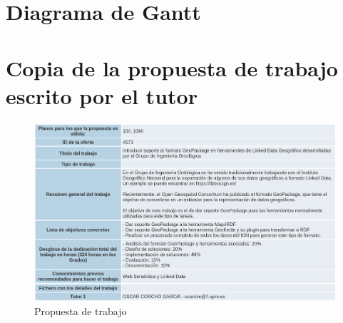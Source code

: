 \documentclass[11pt]{article}
\begin{document}
\section{Diagrama de Gantt}



\section{Copia de la propuesta de trabajo escrito por el tutor}
\begin{figure}[h]
    \includegraphics[width=\textwidth]{./copia.png}
    \centering
    \caption{Propuesta de trabajo}
    \label{fig:propuesta}
\end{figure}

\end{document}

